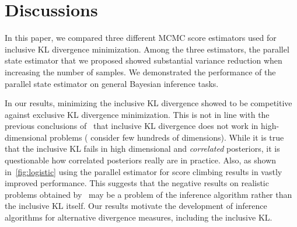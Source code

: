 
\vspace{-0.1in}
\section{Discussions}\label{section:discussion}
\vspace{-0.1in}
In this paper, we compared three different MCMC score estimators used for inclusive KL divergence minimization.
Among the three estimators, the parallel state estimator that we proposed showed substantial variance reduction when increasing the number of samples.
We demonstrated the performance of the parallel state estimator on general Bayesian inference tasks.

In our results, minimizing the inclusive KL divergence showed to be competitive against exclusive KL divergence minimization.
This is not in line with the previous conclusions of~\citet{dhaka_challenges_2021} that inclusive KL divergence does not work in high-dimensional problems (\citeauthor{dhaka_challenges_2021} consider few hundreds of dimensions).
While it is true that the inclusive KL fails in high dimensional and \textit{correlated} posteriors, it is questionable how correlated posteriors really are in practice.
Also, as shown in~\cref{fig:logistic} using the parallel estimator for score climbing results in vastly improved performance.
This suggests that the negative results on realistic problems obtained by~\citet{dhaka_challenges_2021} may be a problem of the inference algorithm rather than the inclusive KL itself.
Our results motivate the development of inference algorithms for alternative divergence measures, including the inclusive KL. 


